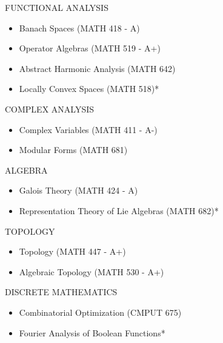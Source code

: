 \documentclass{friggeri-cv} %
\begin{document}
\begin{entrylist}


\entries
{FUNCTIONAL ANALYSIS}
{
\begin{itemize}
    \setlength\itemsep{-1em}
    \item Banach Spaces (MATH 418 - A)\\
    \item Operator Algebras (MATH 519 - A+)\\
    \item Abstract Harmonic Analysis (MATH 642)\\
    \item Locally Convex Spaces (MATH 518)*
\end{itemize}
}


\entries
{COMPLEX ANALYSIS}
{
\begin{itemize}
    \setlength\itemsep{-1em}
    \item Complex Variables (MATH 411 - A-)\\
    \item Modular Forms (MATH 681)
\end{itemize}
}


\entries
{ALGEBRA}
{
\begin{itemize}
    \setlength\itemsep{-1em}
    \item Galois Theory (MATH 424 - A)\\
    \item Representation Theory of Lie Algebras (MATH 682)*
\end{itemize}
}


\entries
{TOPOLOGY}
{
\begin{itemize}
    \setlength\itemsep{-1em}
    \item Topology (MATH 447 - A+)\\
    \item Algebraic Topology (MATH 530 - A+)
\end{itemize}
}


\entries
{DISCRETE MATHEMATICS}
{
\begin{itemize}
    \setlength\itemsep{-1em}
    \item Combinatorial Optimization (CMPUT 675)\\
    \item Fourier Analysis of Boolean Functions*
\end{itemize}
}


\end{entrylist}
\end{document}
